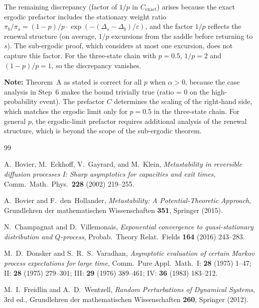 \documentclass[11pt]{article}
\newcommand{\eps}{\varepsilon}
\newcommand{\Ds}{\Delta_s}
\newcommand{\Db}{\Delta_b}
\begin{document}
The remaining discrepancy (factor of $1/p$ in $C_{\mathrm{exact}}$)
arises because the exact ergodic prefactor includes the stationary
weight ratio $\pi_b/\pi_s = (1-p)/p \cdot \exp(-(\Ds-\Db)/\eps)$,
and the factor $1/p$ reflects the renewal structure (on average,
$1/p$ excursions from the saddle before returning to $s$). The
sub-ergodic proof, which considers at most one excursion, does not
capture this factor. For the three-state chain with $p = 0.5$,
$1/p = 2$ and $(1-p)/p = 1$, so the discrepancy vanishes.

\textbf{Note:} Theorem~A as stated is correct for all $p$ when
$\alpha > 0$, because the case analysis in Step~6 makes the bound
trivially true (ratio = 0 on the high-probability event). The
prefactor $C$ determines the scaling of the right-hand side, which
matches the ergodic limit only for $p = 0.5$ in the three-state chain.
For general $p$, the ergodic-limit prefactor requires additional
analysis of the renewal structure, which is beyond the scope of
the sub-ergodic theorem.


\begin{thebibliography}{99}

A.~Bovier, M.~Eckhoff, V.~Gayrard, and M.~Klein,
\emph{Metastability in reversible diffusion processes I:
Sharp asymptotics for capacities and exit times},
Comm.\ Math.\ Phys.\ \textbf{228} (2002) 219--255.

A.~Bovier and F.~den~Hollander,
\emph{Metastability: A Potential-Theoretic Approach},
Grundlehren der mathematischen Wissenschaften \textbf{351},
Springer (2015).

N.~Champagnat and D.~Villemonais,
\emph{Exponential convergence to quasi-stationary distribution
and $Q$-process},
Probab.\ Theory Relat.\ Fields \textbf{164} (2016) 243--283.

M.~D.~Donsker and S.~R.~S.~Varadhan,
\emph{Asymptotic evaluation of certain Markov process expectations
for large time},
Comm.\ Pure Appl.\ Math.\ I: \textbf{28} (1975) 1--47;
II: \textbf{28} (1975) 279--301;
III: \textbf{29} (1976) 389--461;
IV: \textbf{36} (1983) 183--212.

M.~I.~Freidlin and A.~D.~Wentzell,
\emph{Random Perturbations of Dynamical Systems},
3rd ed., Grundlehren der mathematischen Wissenschaften \textbf{260},
Springer (2012).

\end{thebibliography}
\end{document}
